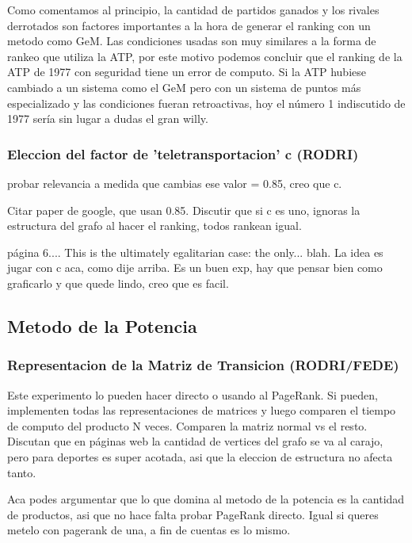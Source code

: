 Como comentamos al principio, la cantidad de partidos ganados y los rivales derrotados son factores importantes a la hora de generar el ranking con un metodo como GeM. Las condiciones usadas son muy similares a la forma de rankeo que utiliza la ATP, por este motivo podemos concluir que el ranking de la ATP de 1977 con seguridad tiene un error de computo. Si la ATP hubiese cambiado a un sistema como el GeM pero con un sistema de puntos más especializado y las condiciones fueran retroactivas, hoy el número 1 indiscutido de 1977 sería sin lugar a dudas el gran willy.

\subsubsection{Eleccion del factor de 'teletransportacion' c (RODRI)}
probar relevancia a medida que cambias ese valor = 0.85, creo que c.

Citar paper de google, que usan 0.85. Discutir que si c es uno, ignoras la estructura del grafo al hacer el ranking, todos rankean igual.

página 6.... This is the ultimately egalitarian case: the only... blah. La idea es jugar con c aca, como dije arriba. Es un buen exp, hay que pensar bien como graficarlo y que quede lindo, creo que es facil.

\subsection{Metodo de la Potencia}

\subsubsection{Representacion de la Matriz de Transicion (RODRI/FEDE)}
Este experimento lo pueden hacer directo o usando al PageRank. Si pueden, implementen todas las representaciones de matrices y luego comparen el tiempo de computo del producto N veces. Comparen la matriz normal vs el resto. Discutan que en páginas web la cantidad de vertices del grafo se va al carajo, pero para deportes es super acotada, asi que la eleccion de estructura no afecta tanto.

Aca podes argumentar que lo que domina al metodo de la potencia es la cantidad de productos, asi que no hace falta probar PageRank directo. Igual si queres metelo con pagerank de una, a fin de cuentas es lo mismo.

